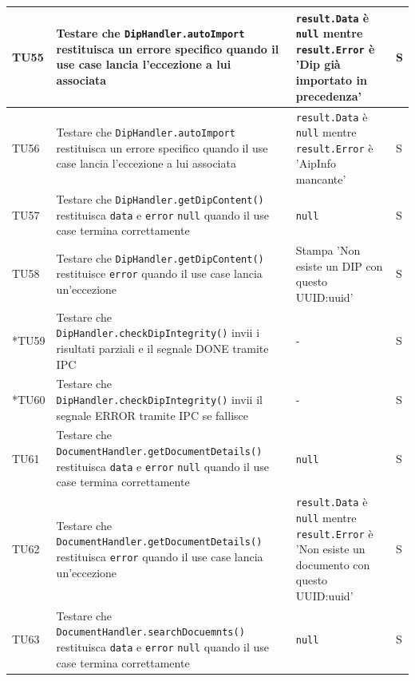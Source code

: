 \documentclass[a4paper,12pt]{article}
\begin{document}
\begin{longtable}{|M{1.2cm}|M{5cm}|M{5cm}|M{1.5cm}|}
            TU55 & Testare che \texttt{DipHandler.autoImport} restituisca un errore specifico quando il use case lancia l'eccezione a lui associata & \texttt{result.Data} è \texttt{null} mentre \texttt{result.Error} è 'Dip già importato in precedenza' & S \\
            \hline

            TU56 & Testare che \texttt{DipHandler.autoImport} restituisca un errore specifico quando il use case lancia l'eccezione a lui associata & \texttt{result.Data} è \texttt{null} mentre \texttt{result.Error} è 'AipInfo mancante' & S \\
            \hline

            TU57 & Testare che \texttt{DipHandler.getDipContent()} restituisca \texttt{data} e \texttt{error} \texttt{null} quando il use case termina correttamente & \texttt{null} & S \\
            \hline

            TU58 & Testare che \texttt{DipHandler.getDipContent()} restituisce \texttt{error} quando il use case lancia un'eccezione & Stampa 'Non esiste un DIP con questo UUID:uuid' & S \\
            \hline

            *TU59 & Testare che \texttt{DipHandler.checkDipIntegrity()} invii i risultati parziali e il segnale DONE tramite IPC & - & S \\
            \hline

            *TU60 & Testare che \texttt{DipHandler.checkDipIntegrity()} invii il segnale ERROR tramite IPC se fallisce & - & S \\
            \hline

            TU61 & Testare che \texttt{DocumentHandler.getDocumentDetails()} restituisca \texttt{data} e \texttt{error} \texttt{null} quando il use case termina correttamente & \texttt{null} & S \\
            \hline

            TU62 & Testare che \texttt{DocumentHandler.getDocumentDetails()} restituisca \texttt{error} quando il use case lancia un'eccezione & \texttt{result.Data} è \texttt{null} mentre \texttt{result.Error} è 'Non esiste un documento con questo UUID:uuid'  & S \\
            \hline

            TU63 & Testare che \texttt{DocumentHandler.searchDocuemnts()} restituisca \texttt{data} e \texttt{error} \texttt{null} quando il use case termina correttamente & \texttt{null} & S \\
            \hline


\end{longtable}
\end{document}
